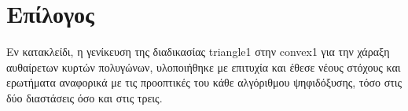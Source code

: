 
\chapter*{Επίλογος}

Εν κατακλείδι, η γενίκευση της διαδικασίας \textlatin{triangle1} στην \textlatin{convex1} για την χάραξη αυθαίρετων κυρτών πολυγώνων, υλοποιήθηκε με επιτυχία και έθεσε νέους στόχους και ερωτήματα αναφορικά με τις προοπτικές του κάθε αλγόριθμου ψηφιδόξυσης, τόσο στις δύο διαστάσεις όσο και στις τρεις.